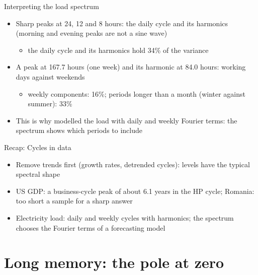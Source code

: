 \begin{frame}{Interpreting the load spectrum}
\itemsize{\small}
\begin{itemize}
    \item Sharp peaks at 24, 12 and 8 hours: the daily cycle and its harmonics (morning and evening peaks are not a sine wave)
    \begin{itemize}
        \item the daily cycle and its harmonics hold 34\% of the variance
    \end{itemize}
    \item A peak at 167.7 hours (one week) and its harmonic at 84.0 hours: working days against weekends
    \begin{itemize}
        \item weekly components: 16\%; periods longer than a month (winter against summer): 33\%
    \end{itemize}
    \item This is why  modelled the load with daily and weekly Fourier terms: the spectrum shows which periods to include
\end{itemize}
\end{frame}

\begin{frame}{Recap: Cycles in data}
\itemsize{\small}
\begin{itemize}
    \item Remove trends first (growth rates, detrended cycles): levels have the typical spectral shape
    \item US GDP: a business-cycle peak of about 6.1 years in the HP cycle; Romania: too short a sample for a sharp answer
    \item Electricity load: daily and weekly cycles with harmonics; the spectrum chooses the Fourier terms of a forecasting model
\end{itemize}
\end{frame}


\section{Long memory: the pole at zero}

